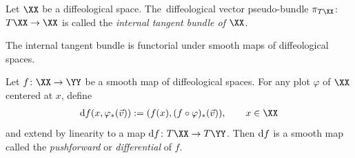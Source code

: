 \begin{Definition}
Let $\XX$ be a diffeological space. The~diffeological vector pseudo-bundle $\pi_{T\XX}$: $T\XX\rightarrow \XX$ is called the \textit{internal tangent bundle of $\XX$}.
\end{Definition}

The internal tangent bundle is functorial under smooth maps of diffeological spaces.

\begin{Definition}\label{differential}
Let $f\colon \XX\rightarrow \YY$ be a smooth map of diffeological spaces. For any plot $\varphi$ of $\XX$ centered at $x$, define
\begin{gather*}
{\rm d}f(x,\varphi_{*}(\vec{v})):=(f(x),(f\circ\varphi)_{*}(\vec{v})),\qquad x\in \XX
\end{gather*}
and extend by linearity to a map ${\rm d}f\colon T\XX\rightarrow T\YY$. Then ${\rm d}f$ is a smooth map~\cite[Proposition~4.8]{cw} called the \textit{pushforward} or \textit{differential} of $f$.
\end{Definition}
